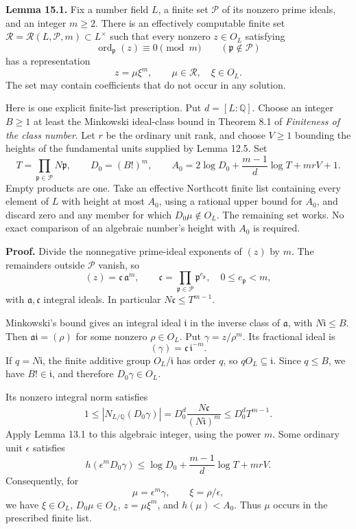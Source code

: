 \documentclass[
  11pt,
  a4paper,
]{article}
\begin{document}
\textbf{Lemma 15.1.} Fix a number field \(L\), a finite set
\(\mathcal P\) of its nonzero prime ideals, and an integer \(m\ge2\).
There is an effectively computable finite set
\(\mathcal R=\mathcal R(L,\mathcal P,m)\subset L^\times\) such that
every nonzero \(z\in O_L\) satisfying \[
\operatorname{ord}_{\mathfrak p}(z)\equiv0\pmod m
\qquad(\mathfrak p\notin\mathcal P)
\tag{15.1}
\] has a representation \[
z=\mu\xi^m,\qquad \mu\in\mathcal R,\quad \xi\in O_L.
\tag{15.2}
\] The set may contain coefficients that do not occur in any solution.

Here is one explicit finite-list prescription. Put \(d=[L:\mathbb Q]\).
Choose an integer \(B\ge1\) at least the Minkowski ideal-class bound in
Theorem 8.1 of \emph{Finiteness of the class number}. Let \(r\) be the
ordinary unit rank, and choose \(V\ge1\) bounding the heights of the
fundamental units supplied by Lemma 12.5. Set \[
T=\prod_{\mathfrak p\in\mathcal P}N\mathfrak p,\qquad
D_0=(B!)^m,\qquad
A_0=2\log D_0+\frac{m-1}{d}\log T+mrV+1.
\tag{15.3}
\] Empty products are one. Take an effective Northcott finite list
containing every element of \(L\) with height at most \(A_0\), using a
rational upper bound for \(A_0\), and discard zero and any member for
which \(D_0\mu\notin O_L\). The remaining set works. No exact comparison
of an algebraic number's height with \(A_0\) is required.

\textbf{Proof.} Divide the nonnegative prime-ideal exponents of \((z)\)
by \(m\). The remainders outside \(\mathcal P\) vanish, so \[
(z)=\mathfrak c\,\mathfrak a^m,\qquad
\mathfrak c=\prod_{\mathfrak p\in\mathcal P}
                    \mathfrak p^{e_{\mathfrak p}},
\quad 0\le e_{\mathfrak p}<m,
\tag{15.4}
\] with \(\mathfrak a,\mathfrak c\) integral ideals. In particular
\(N\mathfrak c\le T^{m-1}\).

Minkowski's bound gives an integral ideal \(\mathfrak i\) in the inverse
class of \(\mathfrak a\), with \(N\mathfrak i\le B\). Then
\(\mathfrak a\mathfrak i=(\rho)\) for some nonzero \(\rho\in O_L\). Put
\(\gamma=z/\rho^m\). Its fractional ideal is \[
(\gamma)=\mathfrak c\,\mathfrak i^{-m}.
\tag{15.5}
\] If \(q=N\mathfrak i\), the finite additive group \(O_L/\mathfrak i\)
has order \(q\), so \(qO_L\subseteq\mathfrak i\). Since \(q\le B\), we
have \(B!\in\mathfrak i\), and therefore \(D_0\gamma\in O_L\).

Its nonzero integral norm satisfies \[
1\le |N_{L/\mathbb Q}(D_0\gamma)|
 =D_0^d\frac{N\mathfrak c}{(N\mathfrak i)^m}
 \le D_0^dT^{m-1}.
\tag{15.6}
\] Apply Lemma 13.1 to this algebraic integer, using the power \(m\).
Some ordinary unit \(\epsilon\) satisfies \[
h(\epsilon^mD_0\gamma)
 \le\log D_0+\frac{m-1}{d}\log T+mrV.
\tag{15.7}
\] Consequently, for \[
\mu=\epsilon^m\gamma,\qquad \xi=\rho/\epsilon,
\tag{15.8}
\] we have \(\xi\in O_L\), \(D_0\mu\in O_L\), \(z=\mu\xi^m\), and
\(h(\mu)<A_0\). Thus \(\mu\) occurs in the prescribed finite list.
\end{document}
